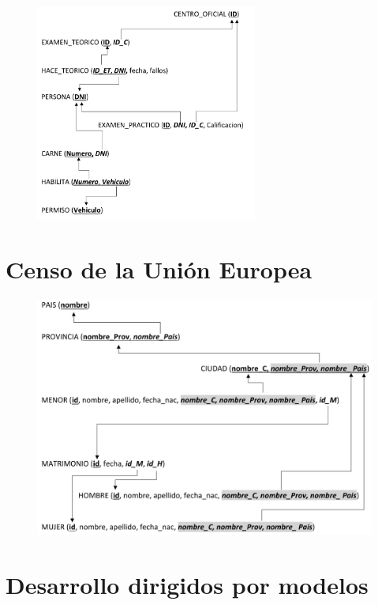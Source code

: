 \documentclass[a4paper]{article}
\begin{document}
\begin{figure}[H]
    \includegraphics[width=0.65\textwidth]{figs/permiso-de-circulacion-sol}
\end{figure}

\section{Censo de la Unión Europea}

\begin{figure}[H]
    \includegraphics[width=\textwidth]{figs/censo-union-europea-sol}
\end{figure}

\section{Desarrollo dirigidos por modelos}
\end{document}
